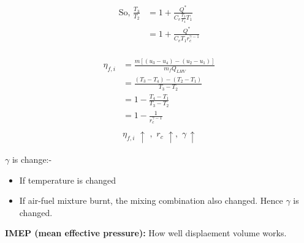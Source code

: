 \documentclass{article}
\begin{document}
\begin{multicols}{2}
		  \begin{align*}
			\text{So, } \frac{T_3}{T_2} &= 1 + \frac{Q^*}{C_v \frac{T_3}{T_4} T_1} \\
			&= 1 + \frac{Q^*}{C_v T_1 r_c^{\gamma -1}} \\
		  \end{align*}

		  \begin{center}
		  \end{center}

		  \begin{align*}
			\eta_{f,i} &= \frac{m\left[(u_3-u_4)-(u_2-u_1)\right]}{m_fQ_{LHV}} \\
			&= \frac{\left(T_3-T_4\right) - \left(T_2-T_1\right)}{T_3 - T_2} \\
			&= 1 - \frac{T_4-T_1}{T_3-T_2} \\
			&= 1 - \frac{1}{r_c^{\gamma -1}} \\
			&\\
			& \eta_{f,i} \,\, \uparrow \,\, , \,\, r_c \,\, \uparrow ,\,\, \gamma \, \uparrow 
		  \end{align*}

		  $\gamma$ is change:-
		  \begin{itemize}
			\item If temperature is changed 
			\item If air-fuel mixture burnt, the mixing combination also changed. Hence $\gamma$ is changed. 
		  \end{itemize}

		  \textbf{IMEP (mean effective pressure):} How well displaement volume works.


\end{multicols}
\end{document}
